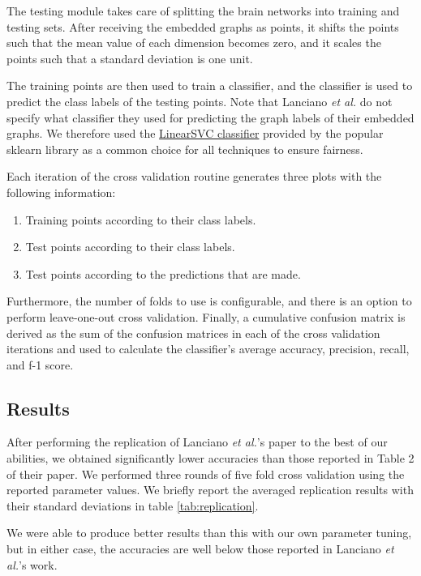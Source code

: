 \documentclass[sigconf]{acmart}
\begin{document}
The testing module takes care of splitting the brain networks into training and testing sets.
After receiving the embedded graphs as points, it shifts the points such that the mean value of each dimension becomes zero, and it scales the points such that a standard deviation is one unit.

The training points are then used to train a classifier, and the classifier is used to predict the class labels of the testing points.
Note that Lanciano \emph{et al.} do not specify what classifier they used for predicting the graph labels of their embedded graphs.
We therefore used the \href{https://scikit-learn.org/stable/modules/generated/sklearn.svm.LinearSVC.html}{LinearSVC classifier} provided by the popular sklearn library as a common choice for all techniques to ensure fairness.

Each iteration of the cross validation routine generates three plots with the following information:
\begin{enumerate}
    \item Training points according to their class labels.
    \item Test points according to their class labels.
    \item Test points according to the predictions that are made.
\end{enumerate}
Furthermore, the number of folds to use is configurable, and there is an option to perform leave-one-out cross validation.
Finally, a cumulative confusion matrix is derived as the sum of the confusion matrices in each of the cross validation iterations and used to calculate the classifier's average accuracy, precision, recall, and f-1 score.

\subsection{Results} \label{results}

After performing the replication of Lanciano \emph{et al.}'s paper to the best of our abilities, we obtained significantly lower accuracies than those reported in Table 2 of their paper.
We performed three rounds of five fold cross validation using the reported parameter values. We briefly report the averaged replication results with their standard deviations in table \ref{tab:replication}.

We were able to produce better results than this with our own parameter tuning, but in either case, the accuracies are well below those reported in Lanciano \emph{et al.}'s work.
\end{document}
